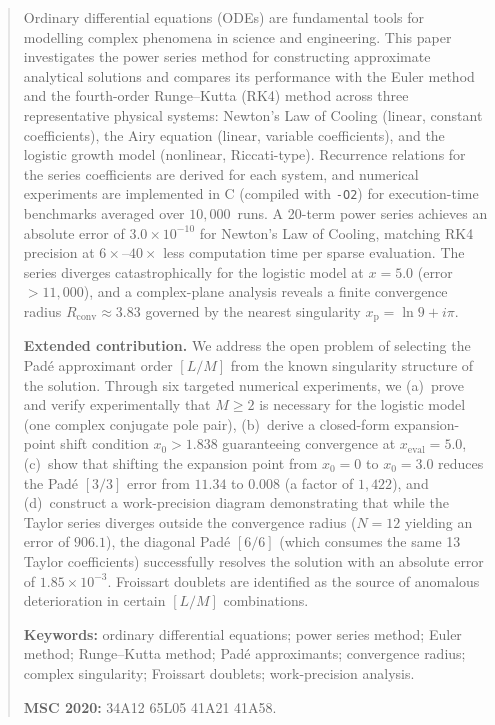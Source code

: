 \documentclass[12pt,a4paper]{article}
\theoremstyle{definition}
\theoremstyle{remark}
\newcommand{\Rconv}{R_{\mathrm{conv}}}
\newcommand{\xp}{x_{\mathrm{p}}}
\begin{document}
\begin{abstract}
\noindent
Ordinary differential equations (ODEs) are fundamental tools for
modelling complex phenomena in science and engineering.  This paper
investigates the power series method for constructing approximate
analytical solutions and compares its performance with the Euler
method and the fourth-order Runge--Kutta (RK4) method across three
representative physical systems: Newton's Law of Cooling (linear,
constant coefficients), the Airy equation (linear, variable
coefficients), and the logistic growth model (nonlinear,
Riccati-type).  Recurrence relations for the series coefficients are
derived for each system, and numerical experiments are implemented in
C (compiled with \texttt{-O2}) for execution-time benchmarks averaged
over $10{,}000$~runs.  A 20-term power series achieves an absolute
error of $3.0 \times 10^{-10}$ for Newton's Law of Cooling, matching
RK4 precision at $6\times$--$40\times$ less computation time per
sparse evaluation.  The series diverges catastrophically for the
logistic model at $x = 5.0$ (error $> 11{,}000$), and a
complex-plane analysis reveals a finite convergence radius
$\Rconv \approx 3.83$ governed by the nearest singularity
$\xp = \ln 9 + i\pi$.

\smallskip
\textbf{Extended contribution.}  We address the open problem of
selecting the Padé approximant order $[L/M]$ from the known
singularity structure of the solution.  Through six targeted
numerical experiments, we (a)~prove and verify experimentally that
$M \geq 2$ is necessary for the logistic model (one complex conjugate
pole pair), (b)~derive a closed-form expansion-point shift condition
$x_0 > 1.838$ guaranteeing convergence at $x_{\mathrm{eval}} = 5.0$,
(c)~show that shifting the expansion point from $x_0 = 0$ to
$x_0 = 3.0$ reduces the Padé $[3/3]$ error from $11.34$ to $0.008$
(a factor of $1{,}422$), and (d)~construct a work-precision diagram
demonstrating that while the Taylor series diverges outside the convergence radius
($N = 12$ yielding an error of $906.1$), the diagonal Padé $[6/6]$
(which consumes the same 13 Taylor coefficients) successfully resolves the solution
with an absolute error of $1.85 \times 10^{-3}$.  Froissart doublets are identified as the source of
anomalous deterioration in certain $[L/M]$ combinations.

\smallskip\noindent
\textbf{Keywords:} ordinary differential equations;
power series method; Euler method; Runge--Kutta method;
Padé approximants; convergence radius; complex singularity;
Froissart doublets; work-precision analysis.

\smallskip\noindent
\textbf{MSC 2020:} 34A12 \textperiodcentered{} 65L05
\textperiodcentered{} 41A21 \textperiodcentered{} 41A58.
\end{abstract}
\end{document}
